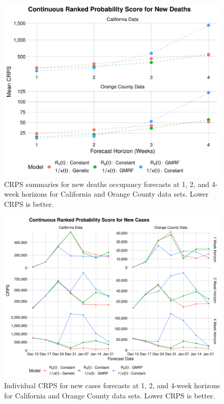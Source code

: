 \begin{figure}
    \centering
    \includegraphics[width=1.0\columnwidth]{real_data_crps_comparison_dotplot_data_new_deaths_plot}
    \caption[CRPS summaries for new deaths occupancy forecasts for real data sets.]{CRPS summaries for new deaths occupancy forecasts at 1, 2, and 4-week horizons for California and Orange County data sets. Lower CRPS is better.}
    \label{ch_5:fig:real_data_crps_comparison_dotplot_data_new_deaths_plot}
\end{figure}

\begin{figure}
    \centering
    \includegraphics[width=1.0\columnwidth]{real_data_crps_comparison_data_new_cases_plot}
    \caption{Individual CRPS for new cases forecasts at 1, 2, and 4-week horizons for California and Orange County data sets. Lower CRPS is better.}
    \label{ch_5:fig:real_data_crps_comparison_data_new_cases_plot}
\end{figure}

